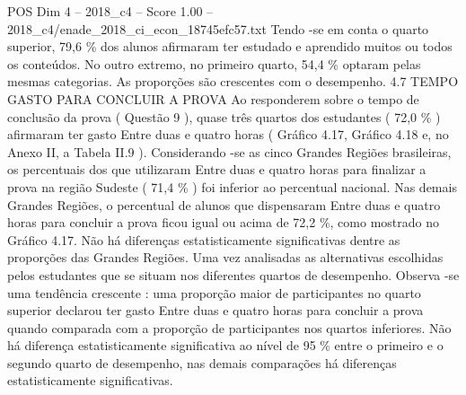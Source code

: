 \begin{textsample}{POS Dim 4 – 2018\_c4 – Score 1.00 – 2018\_c4/enade\_2018\_ci\_econ\_18745efc57.txt}
Tendo -se em conta o quarto superior, 79,6 \% dos alunos afirmaram ter estudado e aprendido muitos ou todos os conteúdos.
No outro extremo, no primeiro quarto, 54,4 \% optaram pelas mesmas categorias.
As proporções são crescentes com o desempenho. 4.7 TEMPO GASTO PARA CONCLUIR A PROVA Ao responderem sobre o tempo de conclusão da prova ( Questão 9 ), quase três quartos dos estudantes ( 72,0 \% ) afirmaram ter gasto Entre duas e quatro horas ( Gráfico 4.17, Gráfico 4.18 e, no Anexo II, a Tabela II.9 ).
Considerando -se as cinco Grandes Regiões brasileiras, os percentuais dos que utilizaram Entre duas e quatro horas para finalizar a prova na região Sudeste ( 71,4 \% ) foi inferior ao percentual nacional.
Nas demais Grandes Regiões, o percentual de alunos que dispensaram Entre duas e quatro horas para concluir a prova ficou igual ou acima de 72,2 \%, como mostrado no Gráfico 4.17.
Não há diferenças estatisticamente significativas dentre as proporções das Grandes Regiões.
Uma vez analisadas as alternativas escolhidas pelos estudantes que se situam nos diferentes quartos de desempenho.
Observa -se uma tendência crescente : uma proporção maior de participantes no quarto superior declarou ter gasto Entre duas e quatro horas para concluir a prova quando comparada com a proporção de participantes nos quartos inferiores.
Não há diferença estatisticamente significativa ao nível de 95 \% entre o primeiro e o segundo quarto de desempenho, nas demais comparações há diferenças estatisticamente significativas.

\end{textsample}
